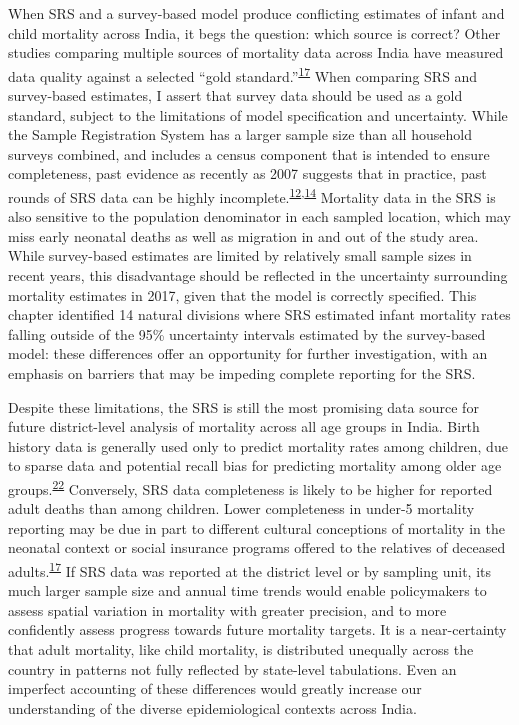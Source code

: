 \documentclass[
]{article}
\begin{document}
When SRS and a survey-based model produce conflicting estimates of infant and child mortality across India, it begs the question: which source is correct? Other studies comparing multiple sources of mortality data across India have measured data quality against a selected ``gold standard.''\textsuperscript{\protect\hyperlink{ref-Kumar2019}{17}} When comparing SRS and survey-based estimates, I assert that survey data should be used as a gold standard, subject to the limitations of model specification and uncertainty. While the Sample Registration System has a larger sample size than all household surveys combined, and includes a census component that is intended to ensure completeness, past evidence as recently as 2007 suggests that in practice, past rounds of SRS data can be highly incomplete.\textsuperscript{\protect\hyperlink{ref-Bhat2002}{12},\protect\hyperlink{ref-Mahapatra2010}{14}} Mortality data in the SRS is also sensitive to the population denominator in each sampled location, which may miss early neonatal deaths as well as migration in and out of the study area. While survey-based estimates are limited by relatively small sample sizes in recent years, this disadvantage should be reflected in the uncertainty surrounding mortality estimates in 2017, given that the model is correctly specified. This chapter identified 14 natural divisions where SRS estimated infant mortality rates falling outside of the 95\% uncertainty intervals estimated by the survey-based model: these differences offer an opportunity for further investigation, with an emphasis on barriers that may be impeding complete reporting for the SRS.

Despite these limitations, the SRS is still the most promising data source for future district-level analysis of mortality across all age groups in India. Birth history data is generally used only to predict mortality rates among children, due to sparse data and potential recall bias for predicting mortality among older age groups.\textsuperscript{\protect\hyperlink{ref-Wakefield2019}{22}} Conversely, SRS data completeness is likely to be higher for reported adult deaths than among children. Lower completeness in under-5 mortality reporting may be due in part to different cultural conceptions of mortality in the neonatal context or social insurance programs offered to the relatives of deceased adults.\textsuperscript{\protect\hyperlink{ref-Kumar2019}{17}} If SRS data was reported at the district level or by sampling unit, its much larger sample size and annual time trends would enable policymakers to assess spatial variation in mortality with greater precision, and to more confidently assess progress towards future mortality targets. It is a near-certainty that adult mortality, like child mortality, is distributed unequally across the country in patterns not fully reflected by state-level tabulations. Even an imperfect accounting of these differences would greatly increase our understanding of the diverse epidemiological contexts across India.
\end{document}
